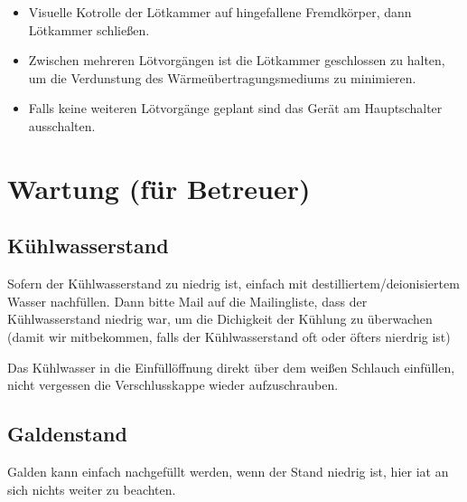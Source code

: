 \documentclass{\basedir/fablab-document}
\begin{document}
\begin{itemize}
	\item Visuelle Kotrolle der Lötkammer auf hingefallene Fremdkörper, dann Lötkammer schließen. 
	\item Zwischen mehreren Lötvorgängen ist die Lötkammer geschlossen zu halten, um die Verdunstung des Wärmeübertragungsmediums zu minimieren.
	\item Falls keine weiteren Lötvorgänge geplant sind das Gerät am Hauptschalter ausschalten. 
	
	\end{itemize}	
	
	\section{Wartung (für Betreuer)}
	
	\subsection{Kühlwasserstand}
	
	Sofern der Kühlwasserstand zu niedrig ist, einfach mit destilliertem/deionisiertem Wasser nachfüllen. Dann bitte Mail auf die Mailingliste, dass der Kühlwasserstand niedrig war, um die Dichigkeit der Kühlung zu überwachen (damit wir mitbekommen, falls der Kühlwasserstand oft oder öfters nierdrig ist)
	
	 Das Kühlwasser in die Einfüllöffnung direkt über dem weißen Schlauch einfüllen, nicht vergessen die Verschlusskappe wieder aufzuschrauben.
	
	\subsection{Galdenstand}	
	
	Galden kann einfach nachgefüllt werden, wenn der Stand niedrig ist, hier iat an sich nichts weiter zu beachten. 
	
	
	\newpage
\end{document}
